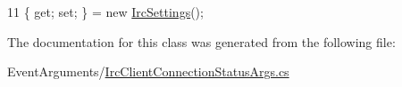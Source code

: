 \begin{DoxyCode}
11 \{ \textcolor{keyword}{get}; \textcolor{keyword}{set}; \} = \textcolor{keyword}{new} \mbox{\hyperlink{class_little_weeb_library_1_1_settings_1_1_irc_settings}{IrcSettings}}();
\end{DoxyCode}


The documentation for this class was generated from the following file\+:\begin{DoxyCompactItemize}
\item 
Event\+Arguments/\mbox{\hyperlink{_irc_client_connection_status_args_8cs}{Irc\+Client\+Connection\+Status\+Args.\+cs}}\end{DoxyCompactItemize}
